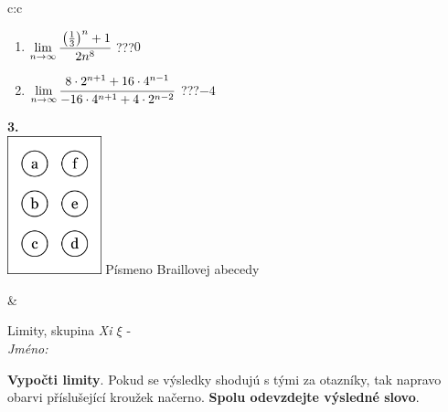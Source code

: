 \documentclass[10pt]{report}
\begin{document}
\begin{tabular}{c:c}
\begin{minipage}[c][104.5mm][t]{0.5\linewidth}
\begin{center}
\begin{minipage}{0.79\linewidth}
\begin{center}
\begin{varwidth}{\linewidth}
\begin{enumerate}
\item $\lim\limits_{n\to\infty}\cfrac{\left(\frac{1}{3}\right)^n +1}{2n^{8}}$\quad \dotfill\; ???\;\dotfill \quad $0$
\item $\lim\limits_{n\to\infty}\cfrac{8\cdot 2^{n+1}+16\cdot 4^{n-1}}{-16\cdot 4^{n+1}+4\cdot 2^{n-2}}$\quad \dotfill\; ???\;\dotfill \quad $-4$
\end{enumerate}
\end{varwidth}
\end{center}
\end{minipage}
\begin{minipage}{0.20\linewidth}
\begin{center}
{\Huge\bfseries 3.} \\[2mm]
\includegraphics[height=40mm]{../images/braille.png}
{\small Písmeno Braillovej abecedy}
\end{center}
\end{minipage}
\end{center}
\end{minipage}
&
\begin{minipage}[c][104.5mm][t]{0.5\linewidth}
\begin{center}
\vspace{7mm}
{\huge Limity, skupina \textit{Xi $\xi$} -}\\[5mm]
\textit{Jméno:}\phantom{xxxxxxxxxxxxxxxxxxxxxxxxxxxxxxxxxxxxxxxxxxxxxxxxxxxxxxxxxxxxxxxxx}\\[5mm]
\begin{minipage}{0.95\linewidth}
\begin{center}
\textbf{Vypočti limity}. Pokud se výsledky shodujú s tými za otazníky, tak napravo\\obarvi příslušející kroužek načerno. \textbf{Spolu odevzdejte výsledné slovo}.
\end{center}
\end{minipage}
\\[1mm]
\begin{minipage}{0.79\linewidth}
\begin{center}
\begin{varwidth}{\linewidth}

\end{varwidth}
\end{center}
\end{minipage}
\end{center}
\end{minipage}
\end{tabular}
\end{document}
